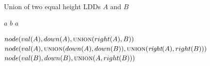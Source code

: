 \documentclass{article}
\newcommand{\var}[1]{\ensuremath{\textit{#1}}}
\begin{document}
\begin{algorithm}[h]
\caption{Union of two equal height LDDs $\var{A}$ and $\var{B}$}
\begin{algorithmic}[1]
	\State \Return $a$
	\State \Return $b$
	\State \Return $a$
\EndIf

	\State \Return $node(val(A), down(A), \textsc{union}(right(A), B))$
	\State \Return $node(val(A), \textsc{union}(down(A), down(B)), \textsc{union}(\textit{right}(A), right(B)))$
	\State \Return $node(val(B), down(B), \textsc{union}(A, right(B)))$	
\EndIf

\EndFunction
\end{algorithmic}
\end{algorithm}
\end{document}
